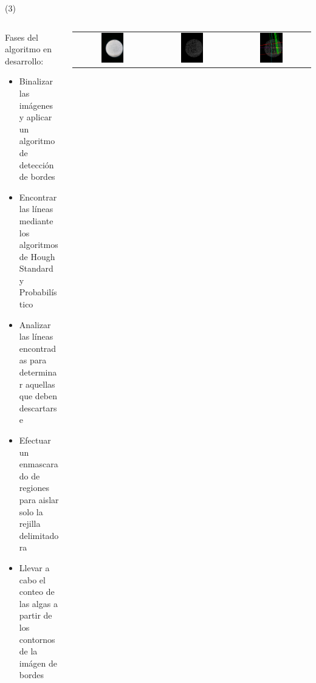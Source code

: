 \begin{frame}{ (3)}
\begin{columns}
\begin{column}{0.50\textwidth}
Fases del algoritmo en desarrollo:
\begin{itemize}
		\item Binalizar las imágenes y aplicar un algoritmo de detección de bordes
        \item Encontrar las líneas mediante los algoritmos de Hough Standard y Probabilístico
        \item Analizar las líneas encontradas para determinar aquellas que deben descartarse 
        \item Efectuar un enmascarado de regiones para aislar solo la rejilla delimitadora
        \item Llevar a cabo el conteo de las algas a partir de los contornos de la imágen de bordes
	\end{itemize}
\end{column}
\begin{column}{0.50\textwidth}  
\begin{center}
     \begin{tabular}{ccc}
         \includegraphics[width=0.31\textwidth]{2022_ConteoMicroAlgas/figs/MicroAlgas01}&
         \includegraphics[width=0.31\textwidth]{2022_ConteoMicroAlgas/figs/02_Canny}&
         \includegraphics[width=0.31\textwidth]{2022_ConteoMicroAlgas/figs/03_LineasEstandar}\\

\end{tabular}
\end{center}
\end{column}
\end{columns}
\end{frame}
